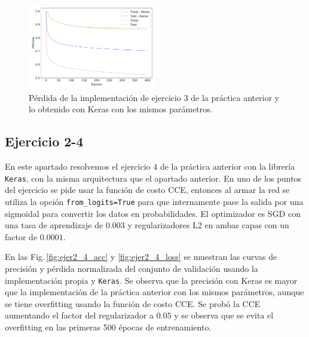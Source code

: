     \begin{figure}[H]
        \begin{small}
            \begin{center}
                \includegraphics[width=0.5\textwidth]{Graphs/ejer2_3_loss.pdf}
            \end{center}
            \caption{Pérdida de la implementación de ejercicio 3 de la práctica anterior y lo obtenido con Keras con los mismos parámetros.}
            \label{fig:ejer2_3_loss}
        \end{small}
    \end{figure}


\subsection*{Ejercicio 2-4}

    En este apartado resolvemos el ejercicio 4 de la práctica anterior con la librería \verb|Keras|, con la misma arquitectura que el apartado anterior. En uno de los puntos del ejercicio se pide usar la función de costo CCE, entonces al armar la red se utiliza la opción \verb|from_logits=True| para que internamente pase la salida por una sigmoidal para convertir los datos en probabilidades. El optimizador es SGD con una tasa de aprendizaje de 0.003 y regularizadores L2 en ambas capas con un factor de $0.0001$.

    En las Fig.\,\ref{fig:ejer2_4_acc} y \ref{fig:ejer2_4_loss} se muestran las curvas de precisión y pérdida normalizada del conjunto de validación usando la implementación propia y \verb|Keras|. Se observa que la precisión con Keras es mayor que la implementación de la práctica anterior con los mismos parámetros, aunque se tiene overfitting usando la función de costo CCE. Se probó la CCE aumentando el factor del regularizador a $0.05$ y se observa que se evita el overfitting en las primeras 500 épocas de entrenamiento.

